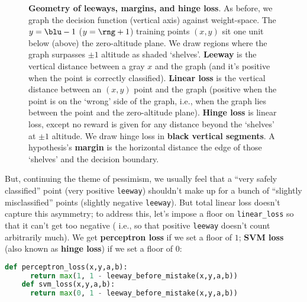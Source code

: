   \begin{figure}[h]
    \centering%
    \caption{%
      \textbf{Geometry of leeways, margins, and hinge loss}.
      As before, we graph the decision function (vertical axis) against
      weight-space.  The $y={\blu -1}$ ($y={\rng +1}$) training points $(x,y)$
      sit one unit below (above) the zero-altitude plane.  We draw regions where
      the graph surpasses $\pm 1$ altitude as {\dgre shaded
      `shelves'}.
      \textbf{Leeway} is the vertical distance between a {\gre gray} $x$
      and the graph (and it's positive when the point is correctly classified).
      \textbf{Linear loss} is the vertical distance between an $(x,y)$ point
      and the graph (positive when the point is on the `wrong' side of the
      graph, i.e., when the graph lies between the point and the zero-altitude
      plane).
      \textbf{Hinge loss} is linear loss, except no reward is given for any
      distance beyond the `shelves' at $\pm 1$ altitude.  We draw hinge loss
      in \textbf{black vertical segments}.
      A hypothesis's \textbf{margin} is the horizontal distance the edge of
      those `shelves' and the decision boundary.
    }
  \end{figure}

  But, continuing the theme of pessimism, we usually feel that a ``very safely
  classified'' point (very positive \texttt{leeway}) shouldn't make up for a
  bunch of ``slightly misclassified'' points (slightly negative
  \texttt{leeway}).
  But total linear loss
  doesn't capture this asymmetry;
  to address this, let's impose a floor on
  \texttt{linear\_loss} so that it can't get too negative
  (%
  i.e., so that
    positive \texttt{leeway} doesn't count arbitrarily much).
  We get \textbf{perceptron loss} if we set a floor of $1$; \textbf{SVM loss}
  (also known as \textbf{hinge loss}) if we set a floor of $0$:
  \begin{lstlisting}[language=Python, basicstyle=\footnotesize\ttfamily]
    def perceptron_loss(x,y,a,b):
      return max(1, 1 - leeway_before_mistake(x,y,a,b))
    def svm_loss(x,y,a,b):
      return max(0, 1 - leeway_before_mistake(x,y,a,b))
  \end{lstlisting}


